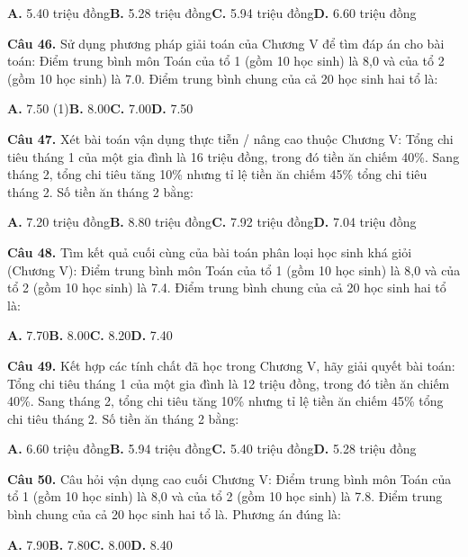 \documentclass[11pt,a4paper]{article}
\begin{document}
\hspace*{1.5em}\textbf{A.} 5.40 triệu đồng\quad\quad \textbf{B.} 5.28 triệu đồng\quad\quad \textbf{C.} 5.94 triệu đồng\quad\quad \textbf{D.} 6.60 triệu đồng\par\vspace{2pt}
\textbf{\color{primary} Câu 46.} Sử dụng phương pháp giải toán của Chương V để tìm đáp án cho bài toán: Điểm trung bình môn Toán của tổ 1 (gồm 10 học sinh) là 8,0 và của tổ 2 (gồm 10 học sinh) là 7.0. Điểm trung bình chung của cả 20 học sinh hai tổ là:\par
\hspace*{1.5em}\textbf{A.} 7.50 (1)\quad\quad \textbf{B.} 8.00\quad\quad \textbf{C.} 7.00\quad\quad \textbf{D.} 7.50\par\vspace{2pt}
\textbf{\color{primary} Câu 47.} Xét bài toán vận dụng thực tiễn / nâng cao thuộc Chương V: Tổng chi tiêu tháng 1 của một gia đình là 16 triệu đồng, trong đó tiền ăn chiếm 40\%. Sang tháng 2, tổng chi tiêu tăng 10\% nhưng tỉ lệ tiền ăn chiếm 45\% tổng chi tiêu tháng 2. Số tiền ăn tháng 2 bằng:\par
\hspace*{1.5em}\textbf{A.} 7.20 triệu đồng\quad\quad \textbf{B.} 8.80 triệu đồng\quad\quad \textbf{C.} 7.92 triệu đồng\quad\quad \textbf{D.} 7.04 triệu đồng\par\vspace{2pt}
\textbf{\color{primary} Câu 48.} Tìm kết quả cuối cùng của bài toán phân loại học sinh khá giỏi (Chương V): Điểm trung bình môn Toán của tổ 1 (gồm 10 học sinh) là 8,0 và của tổ 2 (gồm 10 học sinh) là 7.4. Điểm trung bình chung của cả 20 học sinh hai tổ là:\par
\hspace*{1.5em}\textbf{A.} 7.70\quad\quad \textbf{B.} 8.00\quad\quad \textbf{C.} 8.20\quad\quad \textbf{D.} 7.40\par\vspace{2pt}
\textbf{\color{primary} Câu 49.} Kết hợp các tính chất đã học trong Chương V, hãy giải quyết bài toán: Tổng chi tiêu tháng 1 của một gia đình là 12 triệu đồng, trong đó tiền ăn chiếm 40\%. Sang tháng 2, tổng chi tiêu tăng 10\% nhưng tỉ lệ tiền ăn chiếm 45\% tổng chi tiêu tháng 2. Số tiền ăn tháng 2 bằng:\par
\hspace*{1.5em}\textbf{A.} 6.60 triệu đồng\quad\quad \textbf{B.} 5.94 triệu đồng\quad\quad \textbf{C.} 5.40 triệu đồng\quad\quad \textbf{D.} 5.28 triệu đồng\par\vspace{2pt}
\textbf{\color{primary} Câu 50.} Câu hỏi vận dụng cao cuối Chương V: Điểm trung bình môn Toán của tổ 1 (gồm 10 học sinh) là 8,0 và của tổ 2 (gồm 10 học sinh) là 7.8. Điểm trung bình chung của cả 20 học sinh hai tổ là. Phương án đúng là:\par
\hspace*{1.5em}\textbf{A.} 7.90\quad\quad \textbf{B.} 7.80\quad\quad \textbf{C.} 8.00\quad\quad \textbf{D.} 8.40\par\vspace{2pt}
\end{document}
